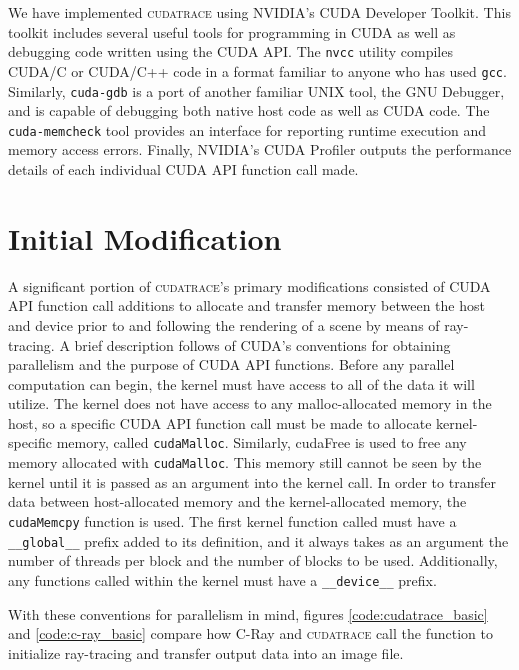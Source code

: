 \documentclass[12pt]{article}
\begin{document}
We have implemented \textsc{cudatrace} using NVIDIA's CUDA Developer Toolkit. This toolkit includes several useful tools for programming in CUDA as well as debugging code written using the CUDA API. The \texttt{nvcc} utility compiles CUDA/C or CUDA/C++ code in a format familiar to anyone who has used \texttt{gcc}. Similarly, \texttt{cuda-gdb} is a port of another familiar UNIX tool, the GNU Debugger, and is capable of debugging both native host code as well as CUDA code. The \texttt{cuda-memcheck} tool provides an interface for reporting runtime execution and memory access errors. Finally, NVIDIA's CUDA Profiler outputs the performance details of each individual CUDA API function call made.


\section{Initial Modification}
A significant portion of \textsc{cudatrace}'s primary modifications consisted of CUDA API function call additions to allocate and transfer memory between the host and device prior to and following the rendering of a scene by means of ray-tracing. A brief description follows of CUDA's conventions for obtaining parallelism and the purpose of CUDA API functions. Before any parallel computation can begin, the kernel must have access to all of the data it will utilize. The kernel does not have access to any malloc-allocated memory in the host, so a specific CUDA API function call must be made to allocate kernel-specific memory, called \texttt{cudaMalloc}. Similarly, cudaFree is used to free any memory allocated with \texttt{cudaMalloc}. This memory still cannot be seen by the kernel until it is passed as an argument into the kernel call. In order to transfer data between host-allocated memory and the kernel-allocated memory, the \texttt{cudaMemcpy} function is used. The first kernel function called must have a \texttt{\_\_global\_\_} prefix added to its definition, and it always takes as an argument the number of threads per block and the number of blocks to be used. Additionally, any functions called within the kernel must have a \texttt{\_\_device\_\_} prefix.    

With these conventions for parallelism in mind, figures \ref{code:cudatrace_basic} and \ref{code:c-ray_basic} compare how C-Ray and \textsc{cudatrace} call the function to initialize ray-tracing and transfer output data into an image file.
\end{document}
